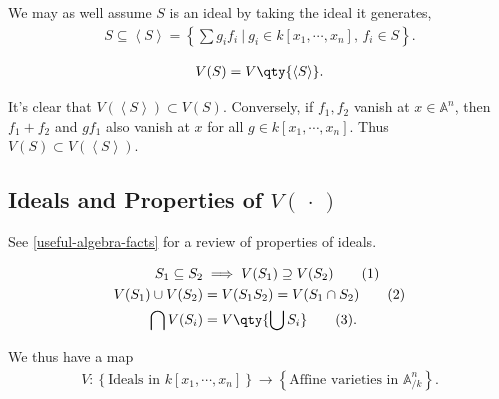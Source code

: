 \begin{remark}

We may as well assume \(S\) is an ideal by taking the ideal it
generates,
\begin{align*}
S\subseteq \left\langle{S}\right\rangle = \left\{{\sum g_i f_i {~\mathrel{\Big|}~}g_i \in k[x_1, \cdots, x_n],\, f_i\in S}\right\}
.\end{align*}

\begin{claim}

\begin{align*}  
V(S) = V\qty{\left\langle{S}\right\rangle}
.\end{align*}

\end{claim}

It's clear that \(V(\left\langle{S}\right\rangle) \subset V(S)\).
Conversely, if \(f_1, f_2\) vanish at \(x\in {\mathbb{A}}^n\), then
\(f_1 + f_2\) and \(gf_1\) also vanish at \(x\) for all
\(g\in k[x_1, \cdots, x_n]\). Thus
\(V(S) \subset V(\left\langle{S}\right\rangle)\).

\end{remark}

\hypertarget{ideals-and-properties-of-vcdot}{%
\subsection{\texorpdfstring{Ideals and Properties of
\(V({\,\cdot\,})\)}{Ideals and Properties of V(\{\textbackslash,\textbackslash cdot\textbackslash,\})}}\label{ideals-and-properties-of-vcdot}}

See \cref{useful-algebra-facts} for a review of properties of ideals.

\begin{proposition}[Properties of $V$]

\begin{align*}  
S_1 \subseteq S_2 &\implies V(S_1) \supseteq V(S_2) \tag{1}\\
V(S_1) \cup V(S_2) &= V(S_1 S_2) = V(S_1 \cap S_2) \tag{2} \\
\bigcap V(S_i) &= V\qty{\bigcup S_i} \tag{3}
.\end{align*}

\end{proposition}

We thus have a map
\begin{align*}  
V: \left\{{\text{Ideals in } k[x_1, \cdots, x_n]}\right\} \to \left\{{\text{Affine varieties in } {\mathbb{A}}^n_{/k}}\right\}
.\end{align*}

